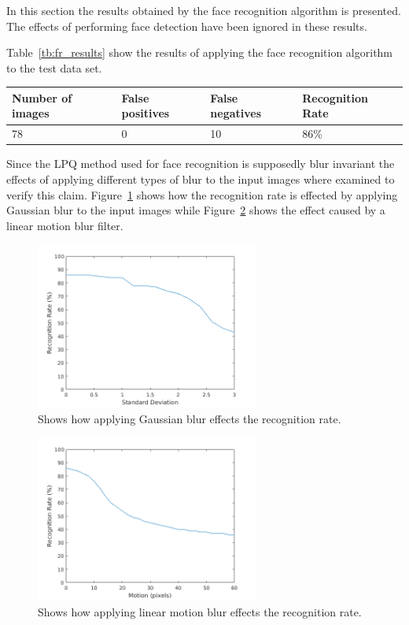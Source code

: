 In this section the results obtained by the face recognition algorithm is  presented. The effects of performing face detection have been ignored in these results.

Table~\ref{tb:fr_results} show the results of applying the face recognition algorithm to the test data set.

\begin{center}
  \label{tb:fr_results}
    \begin{tabular}{ | l | l | l | p{5cm} |}
    \hline
    Number of images & False positives & False negatives & Recognition Rate \\ \hline
    78 & 0 & 10 & 86\% \\ \hline
    \end{tabular}
\end{center}

Since the LPQ method used for face recognition is supposedly blur invariant the effects of applying different types of blur to the input images where examined to verify this claim. Figure~\ref{fig:fr_result_plots_gauss} shows how the recognition rate is effected by applying Gaussian blur to the input images while Figure~\ref{fig:fr_result_plots_motion} shows the effect caused by a linear motion blur filter.

\begin{figure}[H]
\centering
\includegraphics[width=0.65\textwidth]{img/blur_test/gauss_plot.png}
\caption{Shows how applying Gaussian blur effects the recognition rate.}
\label{fig:fr_result_plots_gauss}
\end{figure}

\begin{figure}[H]
\centering
\includegraphics[width=0.65\textwidth]{img/blur_test/motion_plot.png}
\caption{Shows how applying linear motion blur effects the recognition rate.}
\label{fig:fr_result_plots_motion}
\end{figure}

